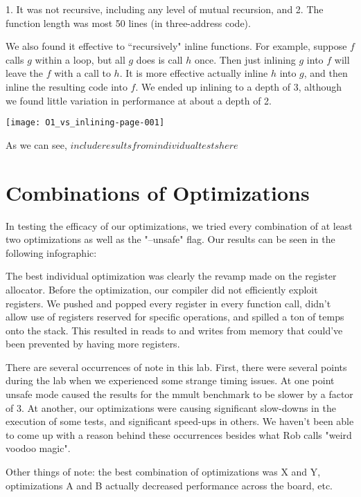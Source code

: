 \documentclass{article}
\begin{document}
1. It was not recursive, including any level of mutual recursion, and
2. The function length was most 50 lines (in three-address code).

We also found it effective to ``recursively" inline functions. For example, suppose $f$ calls $g$ within a loop, but all $g$ does is call $h$ once. Then just inlining $g$ into $f$ will leave the $f$ with a call to $h$. It is more effective actually inline $h$ into $g$, and then inline the resulting code into $f$. We ended up inlining to a depth of 3, although we found little variation in performance at about a depth of 2.

\texttt{[image: O1\_vs\_inlining-page-001]}

As we can see, $include results from individual tests here$


\section{Combinations of Optimizations}

In testing the efficacy of our optimizations, we tried every combination of at least two optimizations as well as the "--unsafe" flag. Our results can be seen in the following infographic:






The best individual optimization was clearly the revamp made on the register allocator. Before the optimization, our compiler did not efficiently exploit registers. We pushed and popped every register in every function call, didn't allow use of registers reserved for specific operations, and spilled a ton of temps onto the stack. This resulted in reads to and writes from memory that could've been prevented by having more registers.

There are several occurrences of note in this lab. First, there were several points during the lab when we experienced some strange timing issues. At one point unsafe mode caused the results for the mmult benchmark to be slower by a factor of 3. At another, our optimizations were causing significant slow-downs in the execution of some tests, and significant speed-ups in others. We haven't been able to come up with a reason behind these occurrences besides what Rob calls "weird voodoo magic".

Other things of note: the best combination of optimizations was X and Y, optimizations A and B actually decreased performance across the board, etc.
\end{document}
